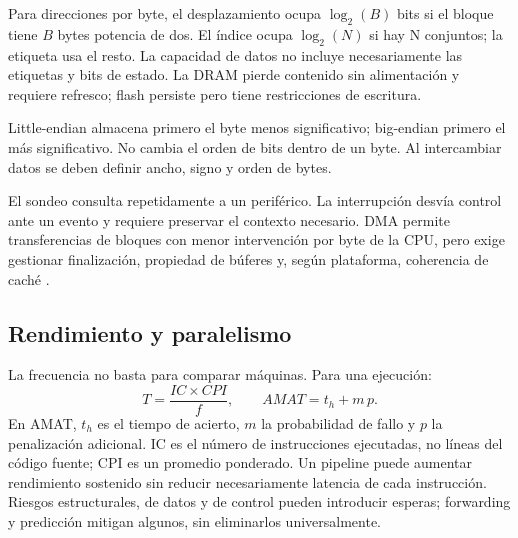 Para direcciones por byte, el desplazamiento ocupa $\log_2(B)$ bits si el bloque tiene $B$ bytes potencia de dos. El índice ocupa $\log_2(N)$ si hay N conjuntos; la etiqueta usa el resto. La capacidad de datos no incluye necesariamente las etiquetas y bits de estado. La DRAM pierde contenido sin alimentación y requiere refresco; flash persiste pero tiene restricciones de escritura.

Little-endian almacena primero el byte menos significativo; big-endian primero el más significativo. No cambia el orden de bits dentro de un byte. Al intercambiar datos se deben definir ancho, signo y orden de bytes.

El sondeo consulta repetidamente a un periférico. La interrupción desvía control ante un evento y requiere preservar el contexto necesario. DMA permite transferencias de bloques con menor intervención por byte de la CPU, pero exige gestionar finalización, propiedad de búferes y, según plataforma, coherencia de caché \cite[volumen 3: interrupciones, gestión de memoria y caché]{intel}.

\subsection{Rendimiento y paralelismo}
La frecuencia no basta para comparar máquinas. Para una ejecución:
\begin{equation}
T=\frac{IC\times CPI}{f},\qquad
AMAT=t_h+m\,p.
\end{equation}
En AMAT, $t_h$ es el tiempo de acierto, $m$ la probabilidad de fallo y $p$ la penalización adicional. IC es el número de instrucciones ejecutadas, no líneas del código fuente; CPI es un promedio ponderado. Un pipeline puede aumentar rendimiento sostenido sin reducir necesariamente latencia de cada instrucción. Riesgos estructurales, de datos y de control pueden introducir esperas; forwarding y predicción mitigan algunos, sin eliminarlos universalmente.


